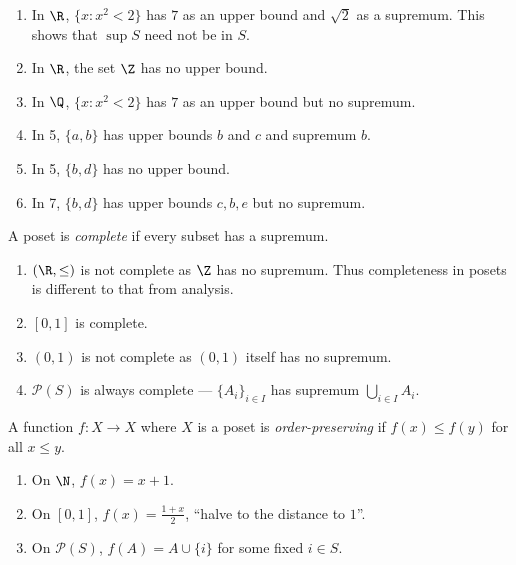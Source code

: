 \documentclass[a4paper]{article}
\begin{document}
\begin{eg}\leavevmode
  \begin{enumerate}
  \item In \(\R\), \(\{x: x^2 < 2\}\) has \(7\) as an upper bound and \(\sqrt 2\) as a supremum. This shows that \(\sup S\) need not be in \(S\).
  \item In \(\R\), the set \(\Z\) has no upper bound.
  \item In \(\Q\), \(\{x: x^2 < 2\}\) has \(7\) as an upper bound but no supremum.
  \item In 5, \(\{a, b\}\) has upper bounds \(b\) and \(c\) and supremum \(b\).
  \item In 5, \(\{b, d\}\) has no upper bound.
  \item In 7, \(\{b, d\}\) has upper bounds \(c, b, e\) but no supremum.
  \end{enumerate}
\end{eg}

\begin{definition}[Completeness]
  A poset is \emph{complete} if every subset has a supremum.
\end{definition}

\begin{eg}\leavevmode
  \begin{enumerate}
  \item \((\R, \leq)\) is not complete as \(\Z\) has no supremum. Thus completeness in posets is different to that from analysis.
  \item \([0, 1]\) is complete.
  \item \((0, 1)\) is not complete as \((0, 1)\) itself has no supremum.
  \item \(\mathcal P(S)\) is always complete --- \(\{A_i\}_{i \in I}\) has supremum \(\bigcup_{i \in I} A_i\).
  \end{enumerate}
\end{eg}

\begin{definition}
  A function \(f: X \to X\) where \(X\) is a poset is \emph{order-preserving} if \(f(x) \leq f(y)\) for all \(x \leq y\).
\end{definition}

\begin{eg}\leavevmode
  \begin{enumerate}
  \item On \(\N\), \(f(x) = x + 1\).
  \item On \([0, 1]\), \(f(x) = \frac{1 + x}{2}\), ``halve to the distance to \(1\)''.
  \item On \(\mathcal P(S)\), \(f(A) = A \cup \{i\}\) for some fixed \(i \in S\).
  \end{enumerate}
\end{eg}
\end{document}
